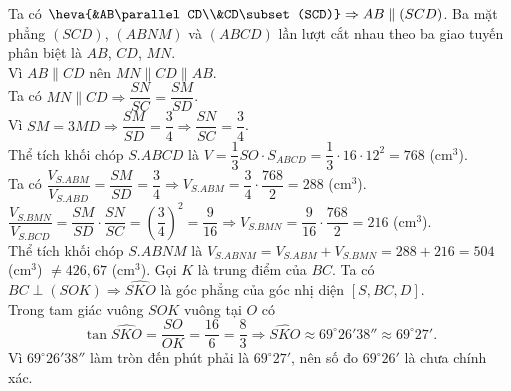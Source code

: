 \begin{ex}
{\begin{itemchoice}
\itemch Ta có $\heva{&AB\parallel CD\\&CD\subset (SCD)}\Rightarrow AB\parallel (SCD)$.
\itemch Ba mặt phẳng $(SCD)$, $(ABNM)$ và $(ABCD)$ lần lượt cắt nhau theo ba giao tuyến phân biệt là $AB$, $CD$, $MN$. \\
Vì $AB\parallel CD$ nên $MN\parallel CD\parallel AB$.\\
Ta có $MN\parallel CD\Rightarrow \dfrac{SN}{SC}=\dfrac{SM}{SD}$.\\
Vì $SM=3MD\Rightarrow \dfrac{SM}{SD}=\dfrac{3}{4}\Rightarrow \dfrac{SN}{SC}=\dfrac{3}{4}$.\\
Thể tích khối chóp $S.ABCD$ là $V=\dfrac{1}{3}SO\cdot S_{ABCD}=\dfrac{1}{3}\cdot 16\cdot 12^2=768$ (cm$^3$).\\
Ta có $\dfrac{V_{S.ABM}}{V_{S.ABD}}=\dfrac{SM}{SD}=\dfrac{3}{4}\Rightarrow V_{S.ABM}=\dfrac{3}{4}\cdot \dfrac{768}{2}=288$ (cm$^3$).\\
$\dfrac{V_{S.BMN}}{V_{S.BCD}}=\dfrac{SM}{SD}\cdot \dfrac{SN}{SC}=\left(\dfrac{3}{4}\right)^2=\dfrac{9}{16}\Rightarrow V_{S.BMN}=\dfrac{9}{16}\cdot \dfrac{768}{2}=216$ (cm$^3$).\\
Thể tích khối chóp $S.ABNM$ là $V_{S.ABNM}=V_{S.ABM}+V_{S.BMN}=288+216=504$ (cm$^3$) $\ne426{,}67$ (cm$^3$).
\itemch Gọi $K$ là trung điểm của $BC$. Ta có $BC\perp (SOK)\Rightarrow \widehat{SKO}$ là góc phẳng của góc nhị diện $[S,BC,D]$.\\
Trong tam giác vuông $SOK$ vuông tại $O$ có
\[\tan \widehat{SKO}=\dfrac{SO}{OK}=\dfrac{16}{6}=\dfrac{8}{3}\Rightarrow \widehat{SKO}\approx69^\circ26'38''\approx69^\circ27'.\]
Vì $69^\circ26'38''$ làm tròn đến phút phải là $69^\circ27'$, nên số đo $69^\circ26'$ là chưa chính xác.
\end{itemchoice}
}
\end{ex}

